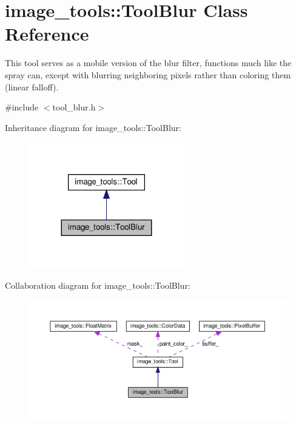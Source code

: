 \hypertarget{classimage__tools_1_1ToolBlur}{}\section{image\+\_\+tools\+:\+:Tool\+Blur Class Reference}
\label{classimage__tools_1_1ToolBlur}


This tool serves as a mobile version of the blur filter, functions much like the spray can, except with blurring neighboring pixels rather than coloring them (linear falloff).  




{\ttfamily \#include $<$tool\+\_\+blur.\+h$>$}



Inheritance diagram for image\+\_\+tools\+:\+:Tool\+Blur\+:
\nopagebreak
\begin{figure}[H]
\begin{center}
\leavevmode
\includegraphics[width=191pt]{classimage__tools_1_1ToolBlur__inherit__graph}
\end{center}
\end{figure}


Collaboration diagram for image\+\_\+tools\+:\+:Tool\+Blur\+:
\nopagebreak
\begin{figure}[H]
\begin{center}
\leavevmode
\includegraphics[width=350pt]{classimage__tools_1_1ToolBlur__coll__graph}
\end{center}
\end{figure}
